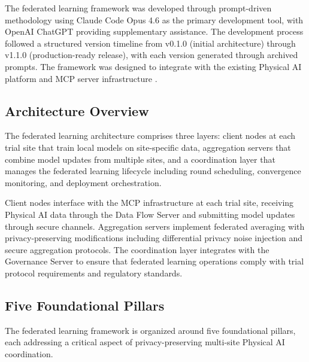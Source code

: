 The federated learning framework was developed through prompt-driven
methodology using Claude Code Opus 4.6 \cite{claude-opus} as the primary
development tool, with OpenAI ChatGPT providing supplementary assistance. The
development process followed a structured version timeline from v0.1.0 (initial
architecture) through v1.1.0 (production-ready release), with each version
generated through archived prompts. The framework was designed to integrate with
the existing Physical AI platform \cite{main-repo} and MCP server
infrastructure \cite{national-mcp-paper}.

\subsection{Architecture Overview}
\label{subsec:fl-architecture}

The federated learning architecture comprises three layers: client nodes at each
trial site that train local models on site-specific data, aggregation servers
that combine model updates from multiple sites, and a coordination layer that
manages the federated learning lifecycle including round scheduling, convergence
monitoring, and deployment orchestration.

Client nodes interface with the MCP infrastructure at each trial site, receiving
Physical AI data through the Data Flow Server and submitting model updates
through secure channels. Aggregation servers implement federated averaging with
privacy-preserving modifications including differential privacy noise injection
and secure aggregation protocols. The coordination layer integrates with the
Governance Server to ensure that federated learning operations comply with
trial protocol requirements and regulatory standards.

\subsection{Five Foundational Pillars}
\label{subsec:fl-pillars}

The federated learning framework is organized around five foundational pillars,
each addressing a critical aspect of privacy-preserving multi-site Physical AI
coordination.

